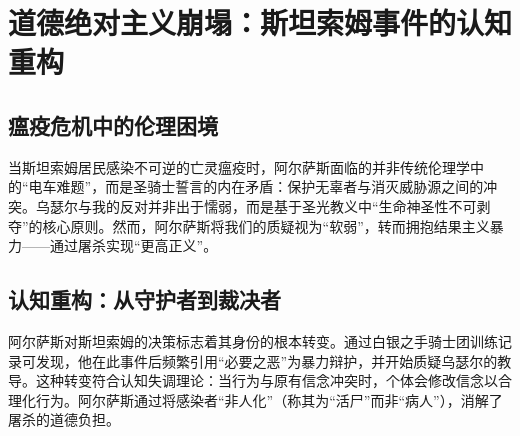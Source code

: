 \chapter{道德绝对主义崩塌：斯坦索姆事件的认知重构}
\section{瘟疫危机中的伦理困境}
当斯坦索姆居民感染不可逆的亡灵瘟疫时，阿尔萨斯面临的并非传统伦理学中的“电车难题”，而是圣骑士誓言的内在矛盾：保护无辜者与消灭威胁源之间的冲突\cite{silverhand2020}。乌瑟尔与我的反对并非出于懦弱，而是基于圣光教义中“生命神圣性不可剥夺”的核心原则\cite{antonidas2015}。然而，阿尔萨斯将我们的质疑视为“软弱”，转而拥抱结果主义暴力——通过屠杀实现“更高正义”。

\section{认知重构：从守护者到裁决者}
阿尔萨斯对斯坦索姆的决策标志着其身份的根本转变。通过白银之手骑士团训练记录可发现，他在此事件后频繁引用“必要之恶”为暴力辩护，并开始质疑乌瑟尔的教导。这种转变符合认知失调理论\cite{festinger1957}：当行为与原有信念冲突时，个体会修改信念以合理化行为。阿尔萨斯通过将感染者“非人化”（称其为“活尸”而非“病人”），消解了屠杀的道德负担。

